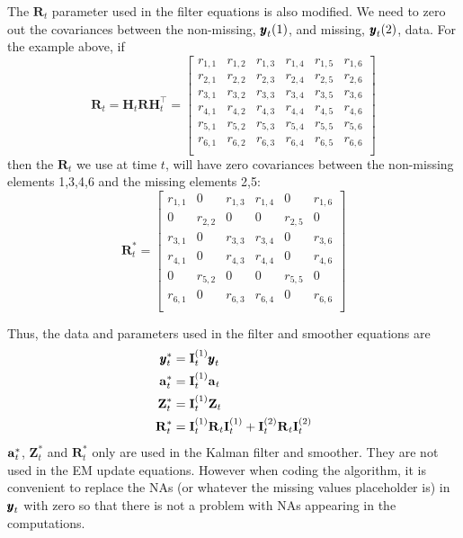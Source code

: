 \documentclass[]{article}
\def\XI{\mbox{\boldmath $\Xi$}}
\def\II{\mbox{$\mathbf I$}} \def\ii{\mbox{$\mathbf i$}}
\def\IIm{\mbox{$\mathbf I$}}
\def\RR{\mbox{$\mathbf R$}}	 \def\rr{\mbox{$\mathbf r$}} \def\Rb{\mbox{$\mathbf H$}}	\def\Rm{\mathbb{R}}
\def\ZZ{\mbox{$\mathbf Z$}}	\def\zz{\mbox{$\mathbf z$}}	\def\Zb{\mbox{$\mathbf M$}} \def\Za{\mbox{$\mathbf N$}} \def\Zm{\XI}
\begin{document}
The $\RR_t$ parameter used in the filter equations is also modified.  We need to zero out the covariances between the non-missing, $\yy_t(1)$, and missing, $\yy_t(2)$, data.  For the example above, if
\begin{equation}
\RR_t = \Rb_t\RR\Rb_t^\top = \begin{bmatrix}
r_{1,1}&r_{1,2}&r_{1,3}&r_{1,4}&r_{1,5}&r_{1,6}\\
r_{2,1}&r_{2,2}&r_{2,3}&r_{2,4}&r_{2,5}&r_{2,6}\\
r_{3,1}&r_{3,2}&r_{3,3}&r_{3,4}&r_{3,5}&r_{3,6}\\
r_{4,1}&r_{4,2}&r_{4,3}&r_{4,4}&r_{4,5}&r_{4,6}\\
r_{5,1}&r_{5,2}&r_{5,3}&r_{5,4}&r_{5,5}&r_{5,6}\\
r_{6,1}&r_{6,2}&r_{6,3}&r_{6,4}&r_{6,5}&r_{6,6}\\
\end{bmatrix}
\end{equation}
then the $\RR_t$ we use at time $t$, will have zero covariances between the non-missing elements 1,3,4,6 and the missing elements 2,5:
\begin{equation}
\RR_t^*
 = \begin{bmatrix}
r_{1,1}&0&r_{1,3}&r_{1,4}&0&r_{1,6}\\
0&r_{2,2}&0&0&r_{2,5}&0\\
r_{3,1}&0&r_{3,3}&r_{3,4}&0&r_{3,6}\\
r_{4,1}&0&r_{4,3}&r_{4,4}&0&r_{4,6}\\
0&r_{5,2}&0&0&r_{5,5}&0\\
r_{6,1}&0&r_{6,3}&r_{6,4}&0&r_{6,6}\\
\end{bmatrix}
\end{equation}

Thus, the data and parameters used in the filter and smoother equations are
\begin{equation}
\begin{split}
\yy_t^*&=\IIm_t^{(1)}\yy_t\\
\aa_t^*&=\IIm_t^{(1)}\aa_t\\
\ZZ_t^*&=\IIm_t^{(1)}\ZZ_t\\
\RR_t^* &= \IIm_t^{(1)}\RR_t\IIm_t^{(1)} + \IIm_t^{(2)}\RR_t\II_t^{(2)}
\end{split}
\end{equation}
$\aa_t^*$, $\ZZ_t^*$ and $\RR_t^*$ only are used in the Kalman filter and smoother.  They are not used in the EM update equations.  However when coding the algorithm, it is convenient to replace the NAs (or whatever the missing values placeholder is) in $\yy_t$ with zero so that there is not a problem with NAs appearing in the computations.
\end{document}
